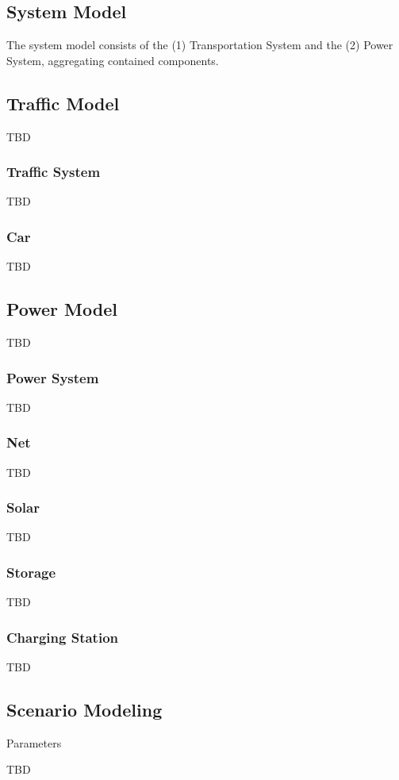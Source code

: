 \subsection{System Model}

The system model consists of the (1) Transportation System and the (2) Power System, aggregating contained components.

\subsection{Traffic Model}

TBD

\subsubsection{Traffic System}

TBD

\subsubsection{Car}

TBD

\subsection{Power Model}

TBD

\subsubsection{Power System}

TBD

\subsubsection{Net}

TBD

\subsubsection{Solar}

TBD

\subsubsection{Storage}

TBD

\subsubsection{Charging Station}

TBD

\subsection{Scenario Modeling}

Parameters

TBD
